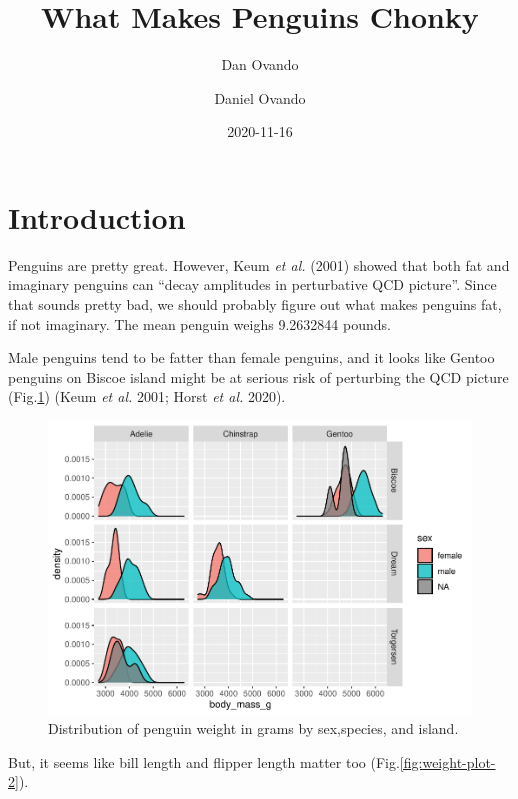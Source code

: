\documentclass[
]{article}
\title{What Makes Penguins Chonky}
\author{Dan Ovando \and Daniel Ovando}
\date{2020-11-16}
\begin{document}
\maketitle

{
\hypersetup{linkcolor=}
\setcounter{tocdepth}{2}
\tableofcontents
}
\hypertarget{introduction}{%
\section{Introduction}\label{introduction}}

Penguins are pretty great. However, Keum \emph{et al.} (2001) showed that both fat and imaginary penguins can ``decay amplitudes in perturbative QCD picture''. Since that sounds pretty bad, we should probably figure out what makes penguins fat, if not imaginary. The mean penguin weighs 9.2632844 pounds.

Male penguins tend to be fatter than female penguins, and it looks like Gentoo penguins on Biscoe island might be at serious risk of perturbing the QCD picture (Fig.\ref{fig:weight-fig}) (Keum \emph{et al.} 2001; Horst \emph{et al.} 2020).

\begin{figure}
\centering
\includegraphics{my-pub_files/figure-latex/weight-fig-1.pdf}
\caption{\label{fig:weight-fig}Distribution of penguin weight in grams by sex,species, and island.}
\end{figure}

But, it seems like bill length and flipper length matter too (Fig.\ref{fig:weight-plot-2}).
\end{document}
